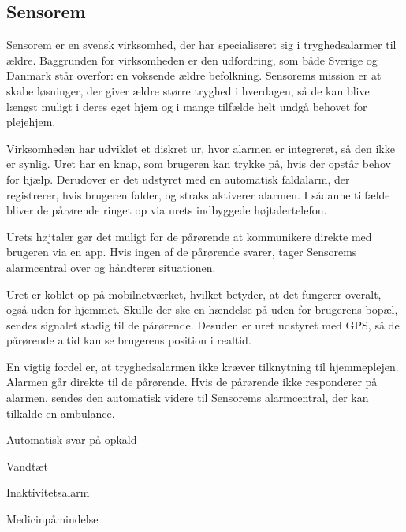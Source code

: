 \subsection{Sensorem}

Sensorem er en svensk virksomhed, der har specialiseret sig i tryghedsalarmer til ældre. Baggrunden for virksomheden er den udfordring, som både Sverige og Danmark står overfor: en voksende ældre befolkning. Sensorems mission er at skabe løsninger, der giver ældre større tryghed i hverdagen, så de kan blive længst muligt i deres eget hjem og i mange tilfælde helt undgå behovet for plejehjem.

Virksomheden har udviklet et diskret ur, hvor alarmen er integreret, så den ikke er synlig. Uret har en knap, som brugeren kan trykke på, hvis der opstår behov for hjælp. Derudover er det udstyret med en automatisk faldalarm, der registrerer, hvis brugeren falder, og straks aktiverer alarmen. I sådanne tilfælde bliver de pårørende ringet op via urets indbyggede højtalertelefon.

Urets højtaler gør det muligt for de pårørende at kommunikere direkte med brugeren via en app. Hvis ingen af de pårørende svarer, tager Sensorems alarmcentral over og håndterer situationen.

Uret er koblet op på mobilnetværket, hvilket betyder, at det fungerer overalt, også uden for hjemmet. Skulle der ske en hændelse på uden for brugerens bopæl, sendes signalet stadig til de pårørende. Desuden er uret udstyret med GPS, så de pårørende altid kan se brugerens position i realtid. 

En vigtig fordel er, at tryghedsalarmen ikke kræver tilknytning til hjemmeplejen. Alarmen går direkte til de pårørende. Hvis de pårørende ikke responderer på alarmen, sendes den automatisk videre til Sensorems alarmcentral, der kan tilkalde en ambulance.

Automatisk svar på opkald

Vandtæt

Inaktivitetsalarm 

Medicinpåmindelse